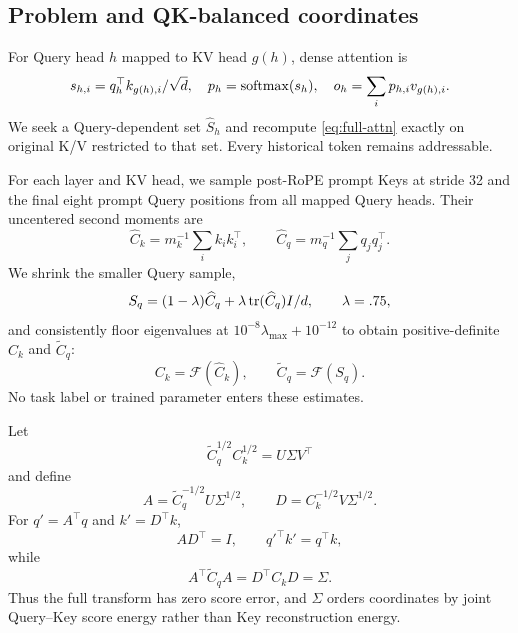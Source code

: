 \section{\method}
\label{sec:method}

\subsection{Problem and QK-balanced coordinates}

For Query head $h$ mapped to KV head $g(h)$, dense attention is
\begin{equation}
 s_{h,i}=q_h^\top k_{g(h),i}/\sqrt d,\quad
 p_h=\operatorname{softmax}(s_h),\quad o_h=\sum_i p_{h,i}v_{g(h),i}.
 \label{eq:full-attn}
\end{equation}
We seek a Query-dependent set $\widehat S_h$ and recompute
\cref{eq:full-attn} exactly on original K/V restricted to that set.  Every
historical token remains addressable.

For each layer and KV head, we sample post-RoPE prompt Keys at stride 32 and
the final eight prompt Query positions from all mapped Query heads.  Their
uncentered second moments are
\begin{equation}
 \widehat C_k=m_k^{-1}\sum_i k_i k_i^\top,\qquad
 \widehat C_q=m_q^{-1}\sum_j q_j q_j^\top .
 \label{eq:qk-moments}
\end{equation}
We shrink the smaller Query sample,
\begin{equation}
 S_q=(1-\lambda)\widehat C_q+\lambda\operatorname{tr}(\widehat C_q)I/d,
 \qquad\lambda=.75,
 \label{eq:q-shrink}
\end{equation}
and consistently floor eigenvalues at
$10^{-8}\lambda_{\max}+10^{-12}$ to obtain positive-definite
$C_k$ and $\widetilde C_q$:
\begin{equation}
 C_k=\mathcal F(\widehat C_k),\qquad
 \widetilde C_q=\mathcal F(S_q).
 \label{eq:moment-floor}
\end{equation}
No task label or trained parameter enters these estimates.

Let
\begin{equation}
 \widetilde C_q^{1/2}C_k^{1/2}=U\Sigma V^\top
 \label{eq:qk-svd}
\end{equation}
and define
\begin{equation}
 A=\widetilde C_q^{-1/2}U\Sigma^{1/2},\qquad
 D=C_k^{-1/2}V\Sigma^{1/2}.
 \label{eq:qk-factors}
\end{equation}
For $q'=A^\top q$ and $k'=D^\top k$,
\begin{equation}
 AD^\top=I,\qquad {q'}^\top k'=q^\top k,
 \label{eq:qk-exact}
\end{equation}
while
\begin{equation}
 A^\top\widetilde C_qA=D^\top C_kD=\Sigma.
 \label{eq:qk-covariance}
\end{equation}
Thus the full transform has zero score error, and $\Sigma$ orders coordinates
by joint Query--Key score energy rather than Key reconstruction energy.

